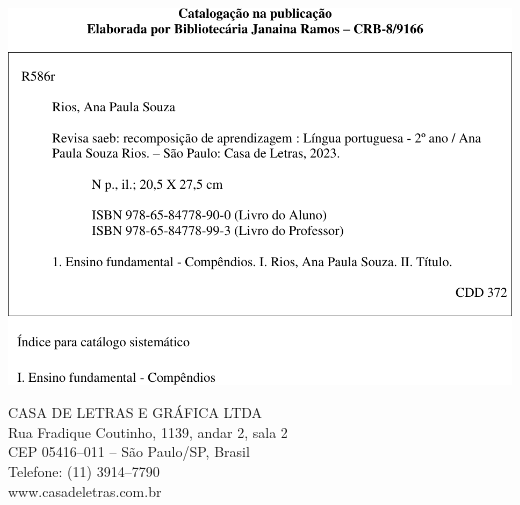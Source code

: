 \noindent\includegraphics[width=.5\textwidth]{../fichas/2POR.png}

\vfill

CASA DE LETRAS E GRÁFICA LTDA\\
Rua Fradique Coutinho, 1139, andar 2, sala 2\\
CEP 05416--011 -- São Paulo/SP, Brasil\\
Telefone: (11) 3914--7790\\\smallskip
www.casadeletras.com.br\\

\endgroup
\pagebreak